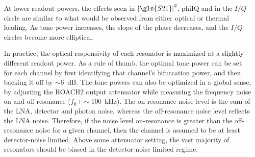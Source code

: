 At lower readout powers, the effects seen in $\left| \gls{S21} \right|^{2}$, \gls{phiIQ} and in the $I/Q$ circle are similar to what would be observed from either optical or thermal loading. As tone power increases, the slope of the phase decreases, and the $I/Q$ circles become more elliptical.

In practice, the optical responsivity of each resonator is maximized at a slightly different readout power. As a rule of thumb, the optimal tone power can be set for each channel by first identifying that channel's bifurcation power, and then backing it off by $\sim$6~dB. The tone powers can also be optimized in a global sense, by adjusting the ROACH2 output attenuator while measuring the frequency noise on and off-resonance ($f_{0} + \sim$100~kHz). The on-resonance noise level is the sum of the LNA, detector and photon noise, whereas the off-resonance noise level reflects the LNA noise. Therefore, if the noise level on-resonance is greater than the off-resonance noise for a given channel, then the channel is assumed to be at least detector-noise limited. Above some attenuator setting, the vast majority of resonators should be biased in the detector-noise limited regime.

